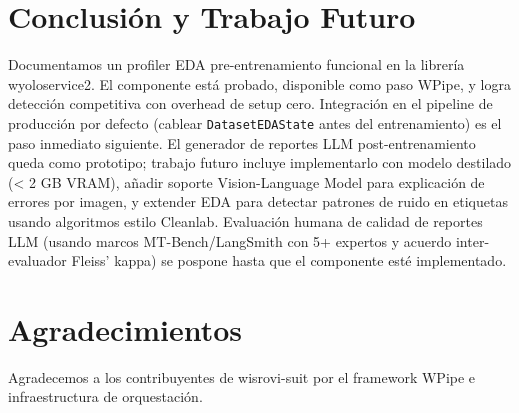 \documentclass[10pt,twocolumn,letterpaper]{article}
\begin{document}
\section{Conclusión y Trabajo Futuro}
Documentamos un profiler EDA pre-entrenamiento funcional en la librería wyoloservice2. El componente está probado, disponible como paso WPipe, y logra detección competitiva con overhead de setup cero. Integración en el pipeline de producción por defecto (cablear \texttt{DatasetEDAState} antes del entrenamiento) es el paso inmediato siguiente. El generador de reportes LLM post-entrenamiento queda como prototipo; trabajo futuro incluye implementarlo con modelo destilado (< 2 GB VRAM), añadir soporte Vision-Language Model para explicación de errores por imagen, y extender EDA para detectar patrones de ruido en etiquetas usando algoritmos estilo Cleanlab. Evaluación humana de calidad de reportes LLM (usando marcos MT-Bench/LangSmith con 5+ expertos y acuerdo inter-evaluador Fleiss' kappa) se pospone hasta que el componente esté implementado.

\section{Agradecimientos}
Agradecemos a los contribuyentes de wisrovi-suit por el framework WPipe e infraestructura de orquestación.



\end{document}
